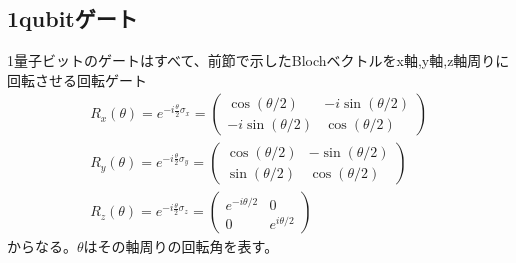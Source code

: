     \subsection{1qubitゲート}
    1量子ビットのゲートはすべて、前節で示したBlochベクトルをx軸,y軸,z軸周りに回転させる回転ゲート
    \begin{equation}
        \begin{array}{l}
        R_{x}(\theta)=e^{-i \frac{\theta}{2} \sigma_{x}}=\left(\begin{array}{cc}
        \cos (\theta / 2) & -i \sin (\theta / 2) \\
        -i \sin (\theta / 2) & \cos (\theta / 2)
        \end{array}\right) \\
        R_{y}(\theta)=e^{-i \frac{\theta}{2} \sigma_{y}}=\left(\begin{array}{cc}
        \cos (\theta / 2) & -\sin (\theta / 2) \\
        \sin (\theta / 2) & \cos (\theta / 2)
        \end{array}\right) \\
        R_{z}(\theta)=e^{-i \frac{\theta}{2} \sigma_{z}}=\left(\begin{array}{cc}
        e^{-i \theta / 2} & 0 \\
        0 & e^{i \theta / 2}
        \end{array}\right)
        \end{array}
        \end{equation}
    からなる。$\theta$はその軸周りの回転角を表す。
